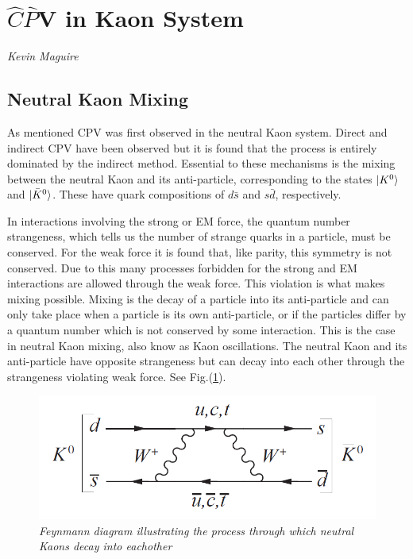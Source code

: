 \section{$\hat{C}\hat{P}$V in Kaon System} 
\vspace{-1.0em}
\begin{center}
\tiny{\textit{Kevin Maguire}}
\end{center}

\subsection{Neutral Kaon Mixing}

As mentioned CPV was first observed in the neutral Kaon system. Direct and indirect CPV have been observed but it is found that the process is entirely dominated by the indirect method. Essential to these mechanisms is the mixing between the neutral Kaon and its anti-particle, corresponding to the states $\ket{K^{0}}$ and $\ket{\bar{K}^{0}}$. These have quark compositions of $d \bar{s}$ and $s \bar{d}$, respectively. 

In interactions involving the strong or EM force, the quantum number strangeness, which tells us the number of strange quarks in a particle, must be conserved. For the weak force it is found that, like parity, this symmetry is not conserved. Due to this many processes forbidden for the strong and EM interactions are allowed through the weak force. This violation is what makes mixing possible. Mixing is the decay of a particle into its anti-particle and can only take place when a particle is its own anti-particle, or if the particles differ by a quantum number which is not conserved by some interaction. This is the case in neutral Kaon mixing, also know as Kaon oscillations. The neutral Kaon and its anti-particle have opposite strangeness but can decay into each other through the strangeness violating weak force. See Fig.(\ref{KaonMixinFeyn}). 

\begin{figure}[h!]
\begin{center}
\includegraphics[scale=0.4]{figs/KevFeyn1.png}
\end{center}
\caption{\textit{Feynmann diagram illustrating the process through which neutral Kaons decay into eachother}}
\label{KaonMixinFeyn}
\end{figure}

